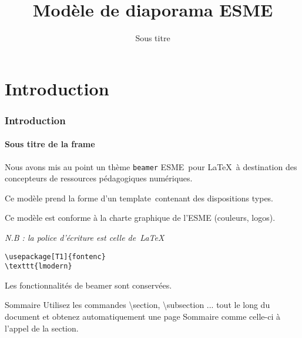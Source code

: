 \documentclass[aspectratio=169]{beamer}
\title{Modèle de diaporama ESME}
\subtitle{Sous titre}
\date[]{}
\author[]{}
\begin{document}
\maketitle %
\section{Introduction}

\begin{frame}[fragile] 
\frametitle{Introduction} 
\framesubtitle{Sous titre de la frame} 

Nous avons mis au point un thème \texttt{beamer} \og ESME\fg~pour 
\LaTeX~à destination des concepteurs de ressources pédagogiques 
numériques.\newline

Ce modèle prend la forme d'un \og template\fg~contenant des 
dispositions types.\newline

Ce modèle est conforme à la charte graphique de l'ESME (couleurs, 
logos).

\emph{N.B : la police d'écriture est celle de~\LaTeX}\newline

\begin{verbatim}
\usepackage[T1]{fontenc}
\texttt{lmodern}
\end{verbatim}

Les fonctionnalités de beamer sont conservées.
\end{frame}

\begin{frame}{Sommaire}
    \tableofcontents
    \scriptsize
    Utilisez les commandes \textbackslash section, \textbackslash subsection ...
    tout le long du document et obtenez automatiquement une page Sommaire 
    comme celle-ci à l'appel de la section. 
\end{frame}
\end{document}

